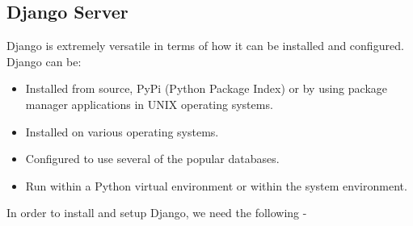 \documentclass[../thesis.tex]{subfiles}
\begin{document}
	\subsection*{Django Server}
	Django is extremely versatile in terms of how it can be installed and configured. Django can be: 
	\begin{itemize}
		\item Installed from source, PyPi (Python Package Index) or by using package manager applications in UNIX operating systems.
		\smallskip
		\item Installed on various operating systems.
		\smallskip
		\item Configured to use several of the popular databases.
		\smallskip
		\item Run within a Python virtual environment or within the system environment.
	\end{itemize}
	In order to install and setup Django, we need the following -
\end{document}
